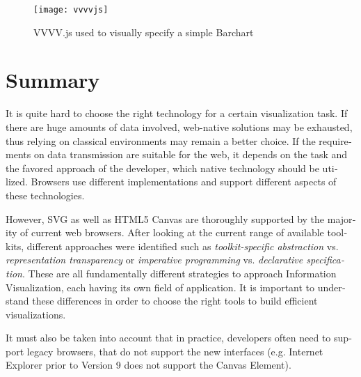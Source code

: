 \begin{english}
\begin{figure}
\centering
\texttt{[image: vvvvjs]}
\caption{VVVV.js used to visually specify a simple Barchart}
\label{fig:vvvvjs}
\end{figure}


\section{Summary}

It is quite hard to choose the right technology for a certain visualization task. If there are huge amounts of data involved, web-native solutions may be exhausted, thus relying on classical environments may remain a better choice. If the requirements on data transmission are suitable for the web, it depends on the task and the favored approach of the developer, which native technology should be utilized. Browsers use different implementations and support different aspects of these technologies. 

However, SVG as well as HTML5 Canvas are thoroughly supported by the majority of current web browsers. After looking at the current range of available toolkits, different approaches were identified such as \emph{toolkit-specific abstraction} vs. \emph{representation transparency} or \emph{imperative programming} vs. \emph{declarative specification}. These are all fundamentally different strategies to approach Information Visualization, each having its own field of application. It is important to understand these differences in order to choose the right tools to build efficient visualizations.

It must also be taken into account that in practice, developers often need to support legacy browsers, that do not support the new interfaces (e.g. Internet Explorer prior to Version 9 does not support the Canvas Element).

\end{english}